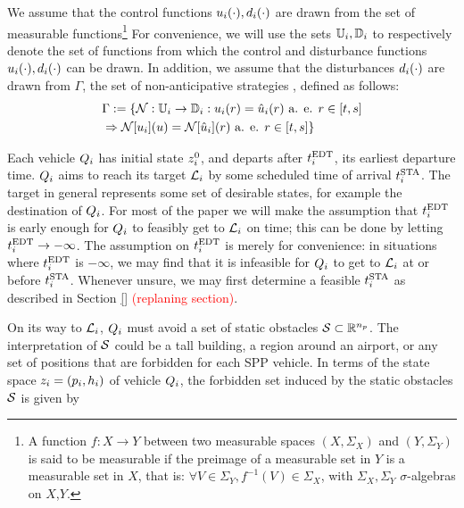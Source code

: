 We assume that the control functions $u_i(\cdot), d_i(\cdot)$ are drawn from the set of measurable functions\footnote{
A function $f:X\to Y$ between two measurable spaces $(X,\Sigma_X)$ and $(Y,\Sigma_Y)$ is said to be measurable if the preimage of a measurable set in $Y$ is a measurable set in $X$, that is: $\forall V\in\Sigma_Y, f^{-1}(V)\in\Sigma_X$, with $\Sigma_X,\Sigma_Y$ $\sigma$-algebras on $X$,$Y$.} For convenience, we will use the sets $\mathbb{U}_i, \mathbb{D}_i$ to respectively denote the set of functions from which the control and disturbance functions $u_i(\cdot), d_i(\cdot)$ can be drawn. In addition, we assume that the disturbances $d_i(\cdot)$ are drawn from $\Gamma$, the set of non-anticipative strategies \cite{Mitchell05}, defined as follows:
\begin{equation}
\begin{aligned}
& \Gamma := \{\mathcal{N}: \mathbb{U}_i \rightarrow \mathbb{D}_i:  u_i(r) = \hat{u}_i(r) \text{ a. e. } r\in[t,s] \\
& \Rightarrow \mathcal{N}[u_i](u) = \mathcal{N}[\hat{u}_i](r) \text{ a. e. } r\in[t,s]\}
\end{aligned}
\end{equation}

Each vehicle $Q_{i}$ has initial state $z^0_i$, and departs after $t^\text{EDT}_i$, its earliest departure time. $Q_{i}$ aims to reach its target $\mathcal{L}_i$ by some scheduled time of arrival $t^\text{STA}_i$. The target in general represents some set of desirable states, for example the destination of $Q_{i}$. For most of the paper we will make the assumption that $t^\text{EDT}_i$ is early enough for $Q_{i}$ to feasibly get to $\mathcal{L}_i$ on time; this can be done by letting $t^\text{EDT}_i \rightarrow -\infty$. The assumption on $t^\text{EDT}_i$ is merely for convenience: in situations where $t^\text{EDT}_i$ is $-\infty$, we may find that it is infeasible for $Q_{i}$ to get to $\mathcal{L}_i$ at or before $t^\text{STA}_i$. Whenever unsure, we may first determine a feasible $t^\text{STA}_i$ as described in Section \ref{} \textcolor{red}{(replaning section)}. 

On its way to $\mathcal{L}_i$, $Q_{i}$ must avoid a set of static obstacles $\mathcal{S} \subset \mathbb{R}^{n_p}$. The interpretation of $\mathcal{S}$ could be a tall building, a region around an airport, or any set of positions that are forbidden for each SPP vehicle. In terms of the state space $z_i = (p_i, h_i)$ of vehicle $Q_{i}$, the forbidden set induced by the static obstacles $\mathcal{S}$ is given by


